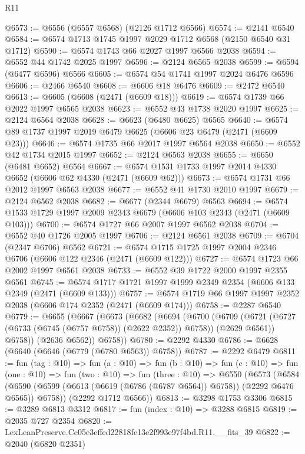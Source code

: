 \begin{lexlean}{R11}
\begin{coremodule}
@6573 := @6556 (@6557 @6568) (@2126 @1712 @6566)
@6574 := @2141 @6540
@6584 := @6574 @1713 @1745 @1997 @2029 @1712 @6568 (@2150 @6540 @31 @1712)
@6590 := @6574 @1743 @66 @2027 @1997 @6566 @2038
@6594 := @6552 @44 @1742 @2025 @1997
@6596 := @2124 @6565 @2038
@6599 := @6594 (@6477 @6596) @6566
@6605 := @6574 @54 @1741 @1997 @2024 @6476 @6596
@6606 := @2466 @6540
@6608 := @6606 @18 @6476
@6609 := @2472 @6540
@6613 := @6605 (@6608 (@2471 (@6609 @18)))
@6619 := @6574 @1739 @66 @2022 @1997 @6565 @2038
@6623 := @6552 @43 @1738 @2020 @1997
@6625 := @2124 @6564 @2038
@6628 := @6623 (@6480 @6625) @6565
@6640 := @6574 @89 @1737 @1997 @2019 @6479 @6625 (@6606 @23 @6479 (@2471 (@6609 @23)))
@6646 := @6574 @1735 @66 @2017 @1997 @6564 @2038
@6650 := @6552 @42 @1734 @2015 @1997
@6652 := @2124 @6563 @2038
@6655 := @6650 (@6481 @6652) @6564
@6667 := @6574 @1531 @1733 @1997 @2014 @4330 @6652 (@6606 @62 @4330 (@2471 (@6609 @62)))
@6673 := @6574 @1731 @66 @2012 @1997 @6563 @2038
@6677 := @6552 @41 @1730 @2010 @1997
@6679 := @2124 @6562 @2038
@6682 := @6677 (@2344 @6679) @6563
@6694 := @6574 @1533 @1729 @1997 @2009 @2343 @6679 (@6606 @103 @2343 (@2471 (@6609 @103)))
@6700 := @6574 @1727 @66 @2007 @1997 @6562 @2038
@6704 := @6552 @40 @1726 @2005 @1997
@6706 := @2124 @6561 @2038
@6709 := @6704 (@2347 @6706) @6562
@6721 := @6574 @1715 @1725 @1997 @2004 @2346 @6706 (@6606 @122 @2346 (@2471 (@6609 @122)))
@6727 := @6574 @1723 @66 @2002 @1997 @6561 @2038
@6733 := @6552 @39 @1722 @2000 @1997 @2355 @6561
@6745 := @6574 @1717 @1721 @1997 @1999 @2349 @2354 (@6606 @133 @2349 (@2471 (@6609 @133)))
@6757 := @6574 @1719 @66 @1997 @1997 @2352 @2038 (@6606 @174 @2352 (@2471 (@6609 @174)))
@6758 := @2287 @6540
@6779 := @6655
    (@6667
      (@6673
        (@6682
          (@6694
            (@6700
              (@6709
                (@6721 (@6727 (@6733 (@6745 (@6757 @6758)) (@2622 @2352)) @6758))
                (@2629 @6561))
              @6758))
          (@2636 @6562))
        @6758))
@6780 := @2292 @4330
@6786 := @6628 (@6640 (@6646 (@6779 (@6780 @6563)) @6758))
@6787 := @2292 @6479
@6811 := fun (tag : @10) =>
  fun (a : @10) =>
  fun (b : @10) =>
  fun (c : @10) =>
  fun (one : @10) =>
  fun (two : @10) =>
  fun (three : @10) =>
  @6550
    (@6573
      (@6584 (@6590 (@6599 (@6613 (@6619 (@6786 (@6787 @6564)) @6758)) (@2292 @6476 @6565)) @6758))
      (@2292 @1712 @6566))
@6813 := @3298 @1753 @3306
@6815 := @3289 @6813 @3312
@6817 := fun (index : @10) => @3288 @6815
@6819 := @2035 @727 @2354
@6820 := LexLeanPreserve.Cc05e3effed22818fe13e2f993e97f4bd.R11.__fits_39
@6822 := @2040 (@6820 @2351)

\end{coremodule}
\end{lexlean}
